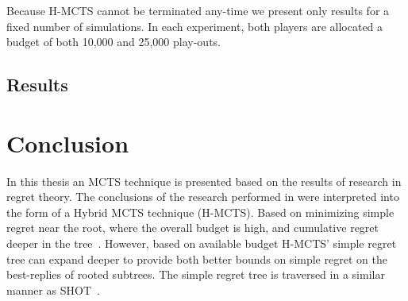 \documentclass{kecsmstr}
\begin{document}
Because H-MCTS cannot be terminated any-time we present only results for a fixed number of simulations. In each experiment, both players are allocated a budget of both 10,000 and 25,000 play-outs.

\section{Results}
\label{sec:results}

\begin{table}[ht]
\centering
\tabcolsep=0.45cm
\vspace{3mm}
{\caption{SHOT vs. UCT with random play-outs, 1,000 games} \label{tab:uct_shot}}
\end{table}


\chapter{Conclusion}
\label{chap:conclusion}
In this thesis an MCTS technique is presented based on the results of research in regret theory. The conclusions of the research performed in  were interpreted into the form of a Hybrid MCTS technique (H-MCTS). Based on minimizing simple regret near the root, where the overall budget is high, and cumulative regret deeper in the tree~. However, based on available budget H-MCTS' simple regret tree can expand deeper to provide both better bounds on simple regret on the best-replies of rooted subtrees. The simple regret tree is traversed in a similar manner as SHOT~.
\end{document}
